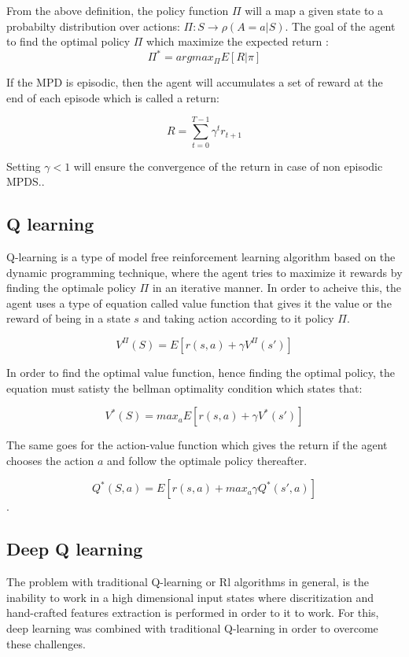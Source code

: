\documentclass[12pt]{article}
\begin{document}
\newpage
From the above definition, the policy function $\Pi$ will  a map a given state to a probabilty distribution over actions: $\Pi: S \longrightarrow \rho(A=a|S)$.
The goal of the agent to find the optimal policy $\Pi$ which maximize the expected return :\\
\[ \Pi^{*} = argmax_{\Pi}  E[R|\pi] \]

If the MPD is episodic, then the agent will accumulates a set of reward at the end of each episode which is called a return:

\[ R= \sum_{t=0}^{T-1} \gamma^{t}r_{t+1} \]

Setting $\gamma<1$ will ensure the convergence of the return in case of non episodic MPDS.\cite{arulkumaran2017brief}.

\subsection{Q learning}
Q-learning is a type of model free reinforcement learning algorithm  based on the dynamic programming technique, where the agent tries to maximize it rewards by finding the optimale policy $\Pi$ in an iterative manner. In order to  acheive this, the agent uses a type of equation called value function that gives it the value or the reward of being in a state $s$ and taking action according to it policy $\Pi$.


\[ V^{\Pi}(S)=E[r(s,a)+\gamma V^{\Pi}(s') ] \] 

In order to find the optimal value function, hence finding the optimal policy, the equation must satisty the bellman optimality condition which states that: 

  
\[ V^{*}(S)=max_{a}E[r(s,a)+\gamma V^{*}(s') ] \] 

The same goes for the action-value function which gives the return if the agent chooses the action $a$ and follow the optimale policy thereafter.

\[ Q^{*}(S,a)=E[r(s,a)+max_{a}\gamma Q^{*}(s',a) ] \]\cite{watkins1992q}.


\pagebreak

\subsection{Deep Q learning}
The problem with traditional Q-learning or Rl algorithms in general, is the inability to work in  a high dimensional input states where discritization and hand-crafted features extraction    is performed in order to it to work. For this, deep learning was combined with traditional Q-learning in order to overcome these challenges.\cite{mnih2013playing}
\end{document}
